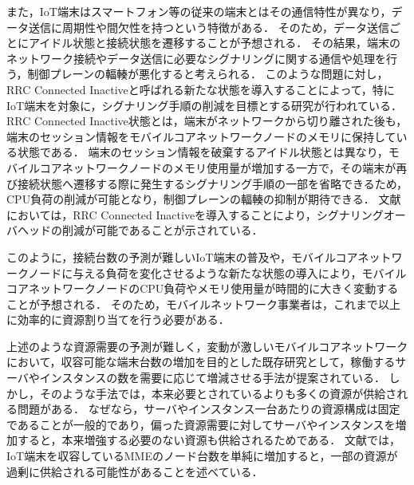 \documentclass[technicalreport]{ieicej-rev}
\begin{document}
また，IoT端末はスマートフォン等の従来の端末とはその通信特性が異なり，データ送信に周期性や間欠性を持つという特徴がある．
そのため，データ送信ごとにアイドル状態と接続状態を遷移することが予想される．
その結果，端末のネットワーク接続やデータ送信に必要なシグナリングに関する通信や処理を行う，制御プレーンの輻輳が悪化すると考えられる．
このような問題に対し，RRC Connected Inactiveと呼ばれる新たな状態を導入することによって，特にIoT端末を対象に，シグナリング手順の削減を目標とする研究が行われている\cite{RRCStateHandlingfor5G,ANovelStateModelfor5GRadioAccessNetworks}．
RRC Connected Inactive状態とは，端末がネットワークから切り離された後も，端末のセッション情報をモバイルコアネットワークノードのメモリに保持している状態である．
端末のセッション情報を破棄するアイドル状態とは異なり，モバイルコアネットワークノードのメモリ使用量が増加する一方で，その端末が再び接続状態へ遷移する際に発生するシグナリング手順の一部を省略できるため，CPU負荷の削減が可能となり，制御プレーンの輻輳の抑制が期待できる．
文献\cite{RRCStateHandlingfor5G,ANovelStateModelfor5GRadioAccessNetworks}においては，RRC Connected Inactiveを導入することにより，シグナリングオーバヘッドの削減が可能であることが示されている．


このように，接続台数の予測が難しいIoT端末の普及や，モバイルコアネットワークノードに与える負荷を変化させるような新たな状態の導入により，モバイルコアネットワークノードのCPU負荷やメモリ使用量が時間的に大きく変動することが予想される．
そのため，モバイルネットワーク事業者は，これまで以上に効率的に資源割り当てを行う必要がある．


上述のような資源需要の予測が難しく，変動が激しいモバイルコアネットワークにおいて，収容可能な端末台数の増加を目的とした既存研究として，稼働するサーバやインスタンスの数を需要に応じて増減させる手法が提案されている\cite{Scale-OutArchitectureforServiceOrderProcessingSystems,ACloudNativeSolutionforDynamicAutoScalingofMMEinLTE,OntheScalabilityof5GCoreNetworkTheAMFCase,DynamicAutoScalingAlgorithm(DASA)for5GMobileNetworks,AnAdaptiveScalingMechanismforManagingPerformanceVariationsinNetworkFunctionsVirtualizationACaseStudyinanNFVBasedEPC}．
しかし，そのような手法では，本来必要とされているよりも多くの資源が供給される問題がある．
なぜなら，サーバやインスタンス一台あたりの資源構成は固定であることが一般的であり，偏った資源需要に対してサーバやインスタンスを増加すると，本来増強する必要のない資源も供給されるためである．
文献\cite{ACloudNativeSolutionforDynamicAutoScalingofMMEinLTE}では，IoT端末を収容しているMMEのノード台数を単純に増加すると，一部の資源が過剰に供給される可能性があることを述べている．
\end{document}

